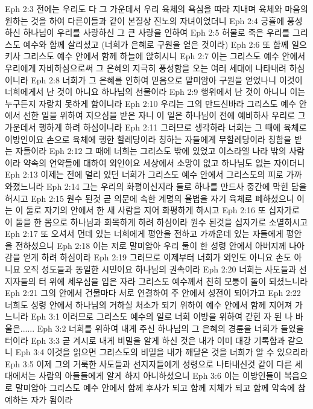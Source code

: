 Eph 2:3  전에는 우리도 다 그 가운데서 우리 육체의 욕심을 따라 지내며 육체와 마음의 원하는 것을 하여 다른이들과 같이 본질상 진노의 자녀이었더니
Eph 2:4  긍휼에 풍성하신 하나님이 우리를 사랑하신 그 큰 사랑을 인하여
Eph 2:5  허물로 죽은 우리를 그리스도 예수와 함께 살리셨고 (너희가 은혜로 구원을 얻은 것이라)
Eph 2:6  또 함께 일으키사 그리스도 예수 안에서 함께 하늘에 앉히시니
Eph 2:7  이는 그리스도 예수 안에서 우리에게 자비하심으로써 그 은혜의 지극히 풍성함을 오는 여러 세대에 나타내려 하심이니라
Eph 2:8  너희가 그 은혜를 인하여 믿음으로 말미암아 구원을 얻었나니 이것이 너희에게서 난 것이 아니요 하나님의 선물이라
Eph 2:9  행위에서 난 것이 아니니 이는 누구든지 자랑치 못하게 함이니라
Eph 2:10  우리는 그의 만드신바라 그리스도 예수 안에서 선한 일을 위하여 지으심을 받은 자니 이 일은 하나님이 전에 예비하사 우리로 그 가운데서 행하게 하려 하심이니라
Eph 2:11  그러므로 생각하라 너희는 그 때에 육체로 이방인이요 손으로 육체에 행한 할례당이라 칭하는 자들에게 무할례당이라 칭함을 받는 자들이라
Eph 2:12  그 때에 너희는 그리스도 밖에 있었고 이스라엘 나라 밖의 사람이라 약속의 언약들에 대하여 외인이요 세상에서 소망이 없고 하나님도 없는 자이더니
Eph 2:13  이제는 전에 멀리 있던 너희가 그리스도 예수 안에서 그리스도의 피로 가까와졌느니라
Eph 2:14  그는 우리의 화평이신지라 둘로 하나를 만드사 중간에 막힌 담을 허시고
Eph 2:15  원수 된것 곧 의문에 속한 계명의 율법을 자기 육체로 폐하셨으니 이는 이 둘로 자기의 안에서 한 새 사람을 지어 화평하게 하시고
Eph 2:16  또 십자가로 이 둘을 한 몸으로 하나님과 화목하게 하려 하심이라 원수 된것을 십자가로 소멸하시고
Eph 2:17  또 오셔서 먼데 있는 너희에게 평안을 전하고 가까운데 있는 자들에게 평안을 전하셨으니
Eph 2:18  이는 저로 말미암아 우리 둘이 한 성령 안에서 아버지께 나아감을 얻게 하려 하심이라
Eph 2:19  그러므로 이제부터 너희가 외인도 아니요 손도 아니요 오직 성도들과 동일한 시민이요 하나님의 권속이라
Eph 2:20  너희는 사도들과 선지자들의 터 위에 세우심을 입은 자라 그리스도 예수께서 친히 모퉁이 돌이 되셨느니라
Eph 2:21  그의 안에서 건물마다 서로 연결하여 주 안에서 성전이 되어가고
Eph 2:22  너희도 성령 안에서 하나님의 거하실 처소가 되기 위하여 예수 안에서 함께 지어져 가느니라
Eph 3:1  이러므로 그리스도 예수의 일로 너희 이방을 위하여 갇힌 자 된 나 바울은......
Eph 3:2  너희를 위하여 내게 주신 하나님의 그 은혜의 경륜을 너희가 들었을 터이라
Eph 3:3  곧 계시로 내게 비밀을 알게 하신 것은 내가 이미 대강 기록함과 같으니
Eph 3:4  이것을 읽으면 그리스도의 비밀을 내가 깨달은 것을 너희가 알 수 있으리라
Eph 3:5  이제 그의 거룩한 사도들과 선지자들에게 성령으로 나타내신것 같이 다른 세대에서는 사람의 아들들에게 알게 하지 아니하셨으니
Eph 3:6  이는 이방인들이 복음으로 말미암아 그리스도 예수 안에서 함께 후사가 되고 함께 지체가 되고 함께 약속에 참예하는 자가 됨이라
